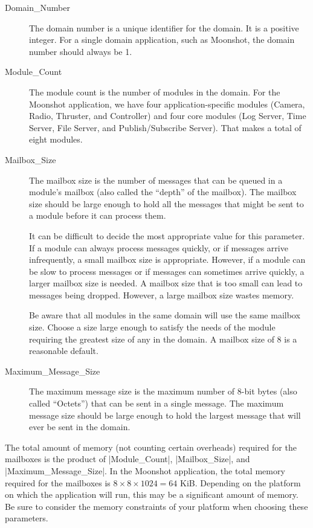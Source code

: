 \begin{description}
  \item[Domain\_Number] The domain number is a unique identifier for the domain. It is a
  positive integer. For a single domain application, such as Moonshot, the domain number should
  always be 1.

  \item[Module\_Count] The module count is the number of modules in the domain. For the Moonshot
  application, we have four application-specific modules (Camera, Radio, Thruster, and
  Controller) and four core modules (Log Server, Time Server, File Server, and Publish/Subscribe
  Server). That makes a total of eight modules.

  \item[Mailbox\_Size] The mailbox size is the number of messages that can be queued in a
  module's mailbox (also called the ``depth'' of the mailbox). The mailbox size should be large
  enough to hold all the messages that might be sent to a module before it can process them.

  It can be difficult to decide the most appropriate value for this parameter. If a module can
  always process messages quickly, or if messages arrive infrequently, a small mailbox size is
  appropriate. However, if a module can be slow to process messages or if messages can sometimes
  arrive quickly, a larger mailbox size is needed. A mailbox size that is too small can lead to
  messages being dropped. However, a large mailbox size wastes memory.

  Be aware that all modules in the same domain will use the same mailbox size. Choose a size
  large enough to satisfy the needs of the module requiring the greatest size of any in the
  domain. A mailbox size of 8 is a reasonable default.

  \item[Maximum\_Message\_Size] The maximum message size is the maximum number of 8-bit bytes
  (also called ``Octets'') that can be sent in a single message. The maximum message size should
  be large enough to hold the largest message that will ever be sent in the domain.
\end{description}

The total amount of memory (not counting certain overheads) required for the mailboxes is the
product of |Module_Count|, |Mailbox_Size|, and |Maximum_Message_Size|. In the Moonshot
application, the total memory required for the mailboxes is $8 \times 8 \times 1024 = 64$ KiB.
Depending on the platform on which the application will run, this may be a significant amount of
memory. Be sure to consider the memory constraints of your platform when choosing these
parameters.

